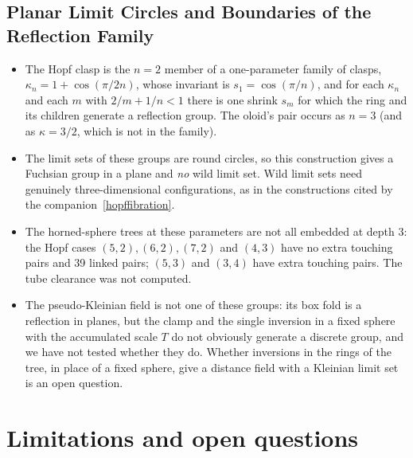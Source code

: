 \documentclass[11pt,a4paper]{article}
\theoremstyle{remark}
\begin{document}
\subsection{Planar Limit Circles and Boundaries of the Reflection Family}

\begin{itemize}[leftmargin=*,itemsep=2pt]
\item The Hopf clasp is the $n=2$ member of a one-parameter family of clasps, $\kappa_n=1+\cos(\pi/2n)$, whose invariant is $s_1=\cos(\pi/n)$, and for each $\kappa_n$ and each $m$ with $2/m+1/n<1$ there is one shrink $s_m$ for which the ring and its children generate a reflection group.  The oloid's pair occurs as $n=3$ (and as $\kappa=3/2$, which is not in the family).
\item The limit sets of these groups are round circles, so this construction gives a Fuchsian group in a plane and \emph{no} wild limit set.  Wild limit sets need genuinely three-dimensional configurations, as in the constructions cited by the companion~\ref{hopffibration}.
\item The horned-sphere trees at these parameters are not all embedded at depth 3: the Hopf cases $(5,2),(6,2),(7,2)$ and $(4,3)$ have no extra touching pairs and 39 linked pairs; $(5,3)$ and $(3,4)$ have extra touching pairs.  The tube clearance was not computed.
\item The pseudo-Kleinian field is not one of these groups: its box fold is a reflection in planes, but the clamp and the single inversion in a fixed sphere with the accumulated scale $T$ do not obviously generate a discrete group, and we have not tested whether they do.  Whether inversions in the rings of the tree, in place of a fixed sphere, give a distance field with a Kleinian limit set is an open question.
\end{itemize}



\section{Limitations and open questions}
\label{sec:limits}
\end{document}
